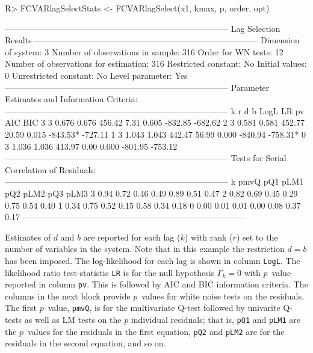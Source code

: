 \documentclass[article]{jss}
\begin{document}
\begin{CodeChunk} 
\begin{CodeInput}
R> FCVARlagSelectStats <- FCVARlagSelect(x1, kmax, p, order, opt)
\end{CodeInput}
\begin{CodeOutput}
--------------------------------------------------------------------------------
                        Lag Selection Results 
--------------------------------------------------------------------------------
Dimension of system:       3     Number of observations in sample:          316 
Order for WN tests:       12     Number of observations for estimation:     316 
Restricted constant:      No     Initial values:                              0
Unrestricted constant:    No     Level parameter:                           Yes
--------------------------------------------------------------------------------
Parameter Estimates and Information Criteria:
--------------------------------------------------------------------------------
 k  r    d    b      LogL     LR    pv    AIC       BIC
 3  3 0.676 0.676  456.42   7.31 0.605  -832.85   -682.62 
 2  3 0.581 0.581  452.77  20.59 0.015  -843.53*  -727.11 
 1  3 1.043 1.043  442.47  56.99 0.000  -840.94   -758.31*
 0  3 1.036 1.036  413.97   0.00 0.000  -801.95   -753.12 
--------------------------------------------------------------------------------
Tests for Serial Correlation of Residuals: 
--------------------------------------------------------------------------------
 k   pmvQ  pQ1   pLM1  pQ2   pLM2  pQ3   pLM3
 3   0.94  0.72  0.46  0.49  0.89  0.51  0.47
 2   0.82  0.69  0.45  0.29  0.75  0.54  0.40
 1   0.34  0.75  0.52  0.15  0.58  0.34  0.18
 0   0.00  0.01  0.01  0.00  0.08  0.37  0.17
--------------------------------------------------------------------------------
\end{CodeOutput}
\end{CodeChunk} 

Estimates of $d$ and $b$ are reported for each lag ($k$) with rank ($r$) set to the number of variables in the system. Note that in this example the restriction $d=b$ has been imposed. The log-likelihood for each lag is shown in column \verb|LogL|. The likelihood ratio test-statistic \verb|LR| is for the null hypothesis $\Gamma_k = 0$ with $p$~value reported in column \verb|pv|. This is followed by AIC and BIC information criteria. The columns in the next block provide $p$~values for white noise tests on the residuals. The first $p$~value, \verb|pmvQ|, is for the multivariate Q-test followed by univarite Q-tests as well as LM tests on the $p$ individual residuals; that is, \verb|pQ1| and \verb|pLM1| are the $p$~values for the residuals in the first equation, \verb|pQ2| and \verb|pLM2| are for the residuals in the second equation, and so on. 
\end{document}

